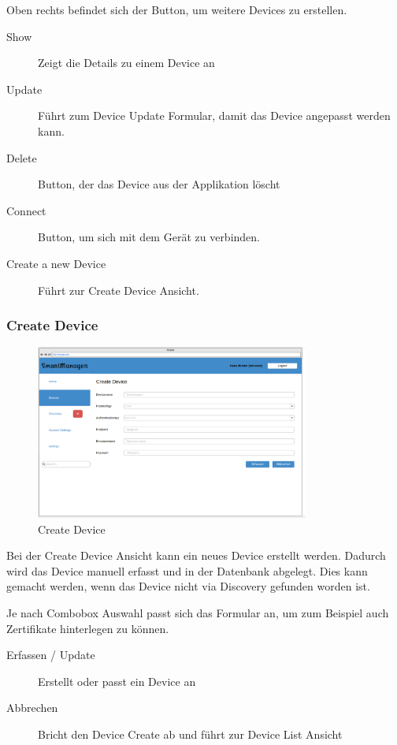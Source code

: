 Oben rechts befindet sich der Button, um weitere Devices zu erstellen.
\begin{description}
\item [Show] Zeigt die Details zu einem Device an
\item [Update] Führt zum Device Update Formular, damit das Device angepasst werden kann.
\item [Delete] Button, der das Device aus der Applikation löscht
\item [Connect] Button, um sich mit dem Gerät zu verbinden.
\item [Create a new Device] Führt zur Create Device Ansicht.
\end{description}


\subsubsection{Create Device}
\begin{figure} [H]
	\begin{center}
	\includegraphics[width=0.80\textwidth]{../03_Design/images/createdevice.png}
	\caption{Create Device}
	\end{center}
\end{figure}
Bei der Create Device Ansicht kann ein neues Device erstellt werden. Dadurch wird das Device manuell erfasst und in der Datenbank abgelegt. Dies kann gemacht werden, wenn das Device nicht via Discovery gefunden worden ist.

Je nach Combobox Auswahl passt sich das Formular an, um zum Beispiel auch Zertifikate hinterlegen zu können.

\begin{description}
\item [Erfassen / Update] Erstellt oder passt ein Device an
\item [Abbrechen] Bricht den Device Create ab und führt zur Device List Ansicht
\end{description}


